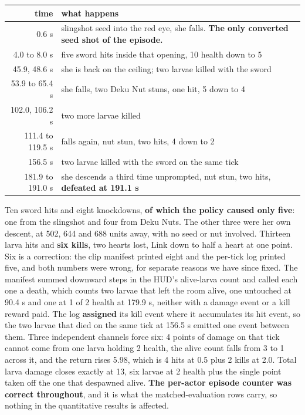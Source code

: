 \documentclass[11pt]{article}
\begin{document}
\begin{table}[!htbp]
  \centering
  \label{tab:therecordedepisodemomentbymo}
\begin{center}\small
\begin{tabularx}{\linewidth}{@{}rX@{}}
\toprule
\textbf{time} & \textbf{what happens} \\
\midrule
0.6 s & slingshot seed into the red eye, she falls. \textbf{The only converted seed shot of the episode.} \\
4.0 to 8.0 s & five sword hits inside that opening, 10 health down to 5 \\
45.9, 48.6 s & she is back on the ceiling; two larvae killed with the sword \\
53.9 to 65.4 s & she falls, two Deku Nut stuns, one hit, 5 down to 4 \\
102.0, 106.2 s & two more larvae killed \\
111.4 to 119.5 s & falls again, nut stun, two hits, 4 down to 2 \\
156.5 s & two larvae killed with the sword on the same tick \\
181.9 to 191.0 s & she descends a third time unprompted, nut stun, two hits, \textbf{defeated at 191.1 s} \\
\bottomrule
\end{tabularx}
\end{center}
\end{table}

Ten sword hits and eight knockdowns, \textbf{of which the policy caused only five}: one from the slingshot and four from Deku Nuts. The other three were her own descent, at 502, 644 and 688 units away, with no seed or nut involved. Thirteen larva hits and \textbf{six kills}, two hearts lost, Link down to half a heart at one point. Six is a correction: the clip manifest printed eight and the per-tick log printed five, and both numbers were wrong, for separate reasons we have since fixed. The manifest summed downward steps in the HUD's alive-larva count and called each one a death, which counts two larvae that left the room alive, one untouched at 90.4 s and one at 1 of 2 health at 179.9 s, neither with a damage event or a kill reward paid. The log \textbf{assigned} its kill event where it accumulates its hit event, so the two larvae that died on the same tick at 156.5 s emitted one event between them. Three independent channels force six: 4 points of damage on that tick cannot come from one larva holding 2 health, the alive count falls from 3 to 1 across it, and the return rises 5.98, which is 4 hits at 0.5 plus 2 kills at 2.0. Total larva damage closes exactly at 13, six larvae at 2 health plus the single point taken off the one that despawned alive. \textbf{The per-actor episode counter was correct throughout}, and it is what the matched-evaluation rows carry, so nothing in the quantitative results is affected.
\end{document}
